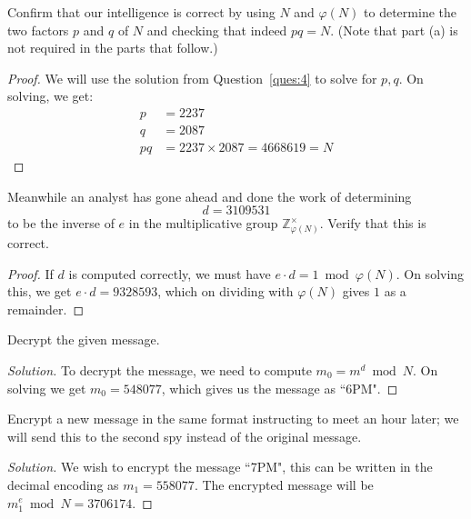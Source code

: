 \begin{solution}[label=ques:3a]
  \begin{question}
    Confirm that our intelligence is correct by using $N$ and $\varphi(N)$ to determine the two factors $p$ and $q$ of $N$ and checking that indeed $pq = N$. (Note that part (a) is not required in the parts that follow.)
  \end{question}
  \tcblower{}
  \begin{proof}
    We will use the solution from Question~\ref{ques:4} to solve for $p, q$. On solving, we get:
    \begin{equation}
      \begin{split}
        p &= 2237\\
        q &= 2087\\
        pq &= 2237 \times 2087 = 4668619 = N
      \end{split}
      \label{eq:pq}
    \end{equation}
  \end{proof}
\end{solution}

\begin{solution}[label=ques:3b]
  \begin{question}
    Meanwhile an analyst has gone ahead and done the work of determining 
\[
d = 3109531
\]
to be the inverse of $e$ in the multiplicative group $\mathbb{Z}_{\varphi(N)}^\times$. Verify that this is correct.
  \end{question}
  \tcblower{}
  \begin{proof}
    If $d$ is computed correctly, we must have $e\cdot d = 1 \bmod \varphi(N)$. On solving this, we get $e\cdot d = 9328593$, which on dividing with $\varphi(N)$ gives $1$ as a remainder.
  \end{proof}
\end{solution}

\begin{solution}[label=ques:3c]
  \begin{question}
    Decrypt the given message.
  \end{question}
  \tcblower{}
  \begin{proof}[Solution]
    To decrypt the message, we need to compute $m_0 = m^d \bmod N$. On solving we get $m_0 = 548077$, which gives us the message as ``6PM".
  \end{proof}
\end{solution}

\begin{solution}[label=ques:3d]
  \begin{question}
    Encrypt a new message in the same format instructing to meet an hour later; we will send this to the second spy instead of the original message.
  \end{question}
  \tcblower{}
  \begin{proof}[Solution]
    We wish to encrypt the message ``7PM", this can be written in the decimal encoding as $m_1 = 558077$. The encrypted message will be $m_1^e \bmod N = 3706174$.
  \end{proof}
\end{solution}
